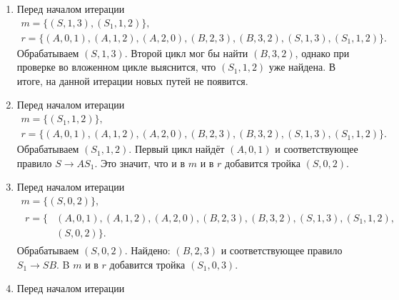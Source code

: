 \begin{example}
\begin{enumerate}
              \begin{gather*}
                  m = \{(B, 3, 2), (S, 1, 3)\},\\
                  r = \{(A, 0, 1), (A, 1, 2), (A, 2, 0), (B, 2, 3), (B, 3, 2), (S, 1, 3)\}.
              \end{gather*}
              Обрабатываем $(B, 3, 2)$.
              Первый цикл найдёт $(S, 1, 3)$ и соответствующее правило $S_1 \to S B$.
              Это значит, что и в $m$ и в $r$ добавится тройка $(S_1, 1, 2)$.
        \item Перед началом итерации
              \begin{gather*}
                  m = \{(S, 1, 3), (S_1, 1, 2)\},\\
                  r = \{(A, 0, 1), (A, 1, 2), (A, 2, 0), (B, 2, 3), (B, 3, 2), (S, 1, 3), (S_1, 1, 2)\}.
              \end{gather*}
              Обрабатываем $(S, 1, 3)$.
              Второй цикл мог бы найти $(B, 3, 2)$, однако при проверке во вложенном цикле выяснится, что $(S_1, 1, 2)$ уже найдена.
              В итоге, на данной итерации новых путей не появится.
        \item Перед началом итерации
              \begin{gather*}
                  m = \{(S_1, 1, 2)\}, \\
                  r = \{(A, 0, 1), (A, 1, 2), (A, 2, 0), (B, 2, 3), (B, 3, 2), (S, 1, 3), (S_1, 1, 2)\}.
              \end{gather*}
              Обрабатываем $(S_1, 1, 2)$.
              Первый цикл найдёт $(A, 0, 1)$ и соответствующее правило $S \to A S_1$.
              Это значит, что и в $m$ и в $r$ добавится тройка $(S, 0, 2)$.
        \item Перед началом итерации
              \begin{gather*}
                  m = \{(S, 0, 2)\}, \\
                  \begin{aligned}
                      r = \{ & (A, 0, 1), (A, 1, 2), (A, 2, 0), (B, 2, 3), (B, 3, 2), (S, 1, 3), (S_1, 1, 2), \\
                             & (S, 0, 2)\}.
                  \end{aligned}
              \end{gather*}
              Обрабатываем $(S, 0, 2)$.
              Найдено: $(B, 2, 3)$ и соответствующее правило $S_1 \to S B$.
              B $m$ и в $r$ добавится тройка $(S_1, 0, 3)$.
        \item Перед началом итерации

\end{enumerate}
\end{example}
